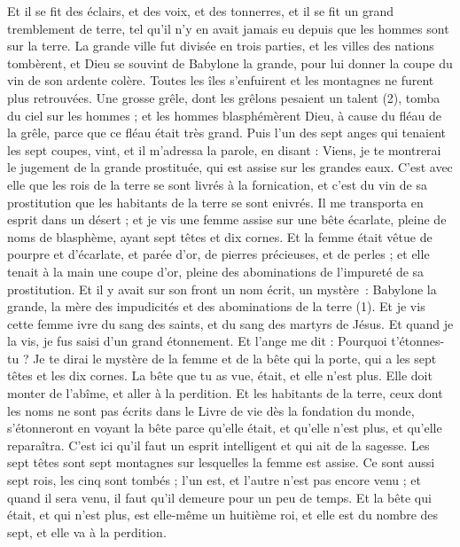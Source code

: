 \begin{multicols}{2}
Et il se fit des éclairs, et des voix, et des tonnerres, et il se fit un grand tremblement de terre, tel qu’il n’y en avait jamais eu depuis que les hommes sont sur la terre.
La grande ville fut divisée en trois parties, et les villes des nations tombèrent, et Dieu se souvint de Babylone la grande, pour lui donner la coupe du vin de son ardente colère.
Toutes les îles s'enfuirent et les montagnes ne furent plus retrouvées.
Une grosse grêle, dont les grêlons pesaient un talent (2), tomba du ciel sur les hommes ; et les hommes blasphémèrent Dieu, à cause du fléau de la grêle, parce que ce fléau était très grand.
\VerseOne{}Puis l'un des sept anges qui tenaient les sept coupes, vint, et il m’adressa la parole, en disant : Viens, je te montrerai le jugement de la grande prostituée, qui est assise sur les grandes eaux.
C’est avec elle que les rois de la terre se sont livrés à la fornication, et c’est du vin de sa prostitution que les habitants de la terre se sont enivrés.
Il me transporta en esprit dans un désert ; et je vis une femme assise sur une bête écarlate, pleine de noms de blasphème, ayant sept têtes et dix cornes.
Et la femme était vêtue de pourpre et d'écarlate, et parée d'or, de pierres précieuses, et de perles ; et elle tenait à la main une coupe d'or, pleine des abominations de l'impureté de sa prostitution.
Et il y avait sur son front un nom écrit, un mystère : Babylone la grande, la mère des impudicités et des abominations de la terre (1).
Et je vis cette femme ivre du sang des saints, et du sang des martyrs de Jésus. Et quand je la vis, je fus saisi d'un grand étonnement.
Et l'ange me dit : Pourquoi t'étonnes-tu ? Je te dirai le mystère de la femme et de la bête qui la porte, qui a les sept têtes et les dix cornes.
La bête que tu as vue, était, et elle n'est plus. Elle doit monter de l'abîme, et aller à la perdition. Et les habitants de la terre, ceux dont les noms ne sont pas écrits dans le Livre de vie dès la fondation du monde, s'étonneront en voyant la bête parce qu’elle était, et qu’elle n'est plus, et qu’elle reparaîtra.
C'est ici qu’il faut un esprit intelligent et qui ait de la sagesse. Les sept têtes sont sept montagnes sur lesquelles la femme est assise.
Ce sont aussi sept rois, les cinq sont tombés ; l'un est, et l'autre n'est pas encore venu ; et quand il sera venu, il faut qu'il demeure pour un peu de temps.
Et la bête qui était, et qui n'est plus, est elle-même un huitième roi, et elle est du nombre des sept, et elle va à la perdition.

\end{multicols}
